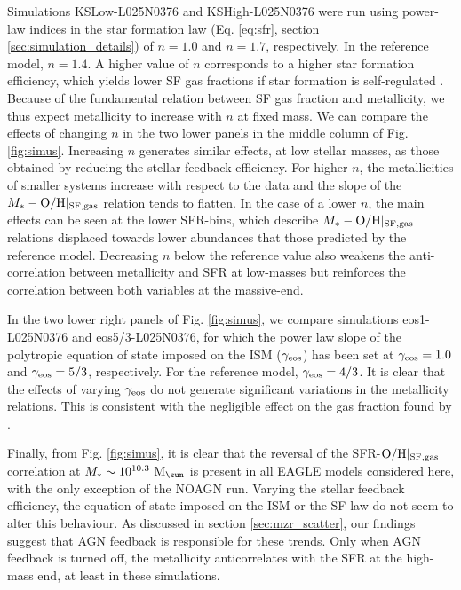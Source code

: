 \documentclass[useAMS,usenatbib]{mn2e}
\begin{document}
Simulations KSLow-L025N0376 and KSHigh-L025N0376 were run using 
power-law indices in the star formation law (Eq. \ref{eq:sfr}, section \ref{sec:simulation_details})
of $n=1.0$ and $n=1.7$, respectively.
In the reference model, $n=1.4$. A higher value of $n$ corresponds to a higher star formation efficiency, which 
yields lower SF gas fractions if star formation is self-regulated \citep{schaye2010, haas2013}.
Because of the fundamental relation between SF gas fraction and metallicity, we thus expect metallicity to increase
with $n$ at fixed mass.
We can compare the effects of changing $n$ in the two lower panels in the middle column of Fig. \ref{fig:simus}.
Increasing $n$ generates similar effects,
at low stellar masses,
as those obtained by reducing the stellar feedback efficiency.  For higher $n$,
the metallicities of smaller systems increase with respect to the data and the slope of 
the $M_* - {\rm O/H}|_{\rm SF,gas}$ relation tends to flatten.  
In the case of a lower $n$, the main effects can be seen at the lower SFR-bins, which
describe $M_* - {\rm O/H}|_{\rm SF,gas}$ relations displaced 
towards lower abundances that those predicted by the reference model.  
Decreasing $n$ below the reference value also weakens the anti-correlation between metallicity
and SFR at low-masses but reinforces the correlation between both variables at the massive-end.

In the two lower right panels of Fig. \ref{fig:simus}, we compare simulations
eos1-L025N0376 and eos5/3-L025N0376, for which
the power law slope of the polytropic equation of state imposed on the ISM ($\gamma_{\rm eos}$) 
has been set at $\gamma_{\rm eos} = 1.0$ and $\gamma_{\rm eos} = 5 / 3$, respectively.
For the reference model, $\gamma_{\rm eos} = 4/3$.
It is clear that the effects of varying $\gamma_{\rm eos}$ 
do not generate significant variations in the metallicity relations.
This is consistent with the negligible effect on the gas fraction found by \citet{haas2013}.

Finally, from Fig. \ref{fig:simus}, it is clear that the reversal of the SFR-${\rm O/H}|_{\rm SF,gas}$
correlation at $M_* \sim 10^{10.3} \ {\rm M}_{\sun}$ is present in all {\sc EAGLE} models
considered here, with the only exception of the NOAGN run.  Varying the stellar feedback
efficiency, the equation of state imposed on the ISM or the SF law do not seem to alter this 
behaviour.  As discussed in section \ref{sec:mzr_scatter}, our findings suggest that AGN feedback 
is responsible for these trends.  Only when AGN feedback is turned off, the metallicity anticorrelates
with the SFR at the high-mass end, at least in these simulations.
\end{document}
